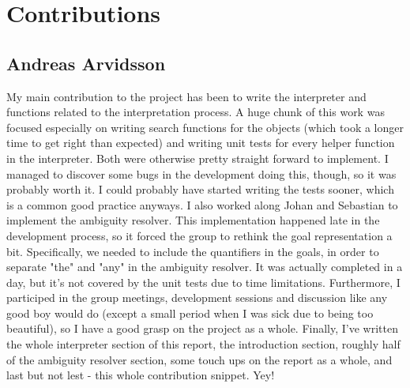 \section*{Contributions}
\subsection*{Andreas Arvidsson}
My main contribution to the project has been to write the interpreter and functions related to the interpretation process.
A huge chunk of this work was focused especially on writing search functions for the objects (which took a longer time to get right than expected) and writing unit tests for every helper function in the interpreter.
Both were otherwise pretty straight forward to implement.
I managed to discover some bugs in the development doing this, though, so it was probably worth it. I could probably have started writing the tests sooner, which is a common good practice anyways.
\newline
\newline
I also worked along Johan and Sebastian to implement the ambiguity resolver.
This implementation happened late in the development process, so it forced the group to rethink the goal representation a bit.
Specifically, we needed to include the quantifiers in the goals, in order to separate "the" and "any" in the ambiguity resolver.
It was actually completed in a day, but it's not covered by the unit tests due to time limitations.
\newline
\newline
Furthermore, I participed in the group meetings, development sessions and discussion like any good boy would do (except a small period when I was sick due to being too beautiful), so I have a good grasp on the project as a whole.
\newline
\newline
Finally, I've written the whole interpreter section of this report, the introduction section, roughly half of the ambiguity resolver section, some touch ups on the report as a whole, and last but not lest - this whole contribution snippet. Yey!

\newpage
